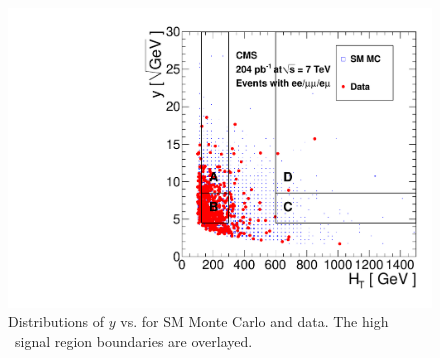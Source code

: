 \begin{figure}[tbh]
\begin{center}
\includegraphics[width=0.7\linewidth]{plots/abcd_204pb_highht.pdf}
\caption{\label{fig:abcdData3}\protect Distributions of $y$ 
vs. \Ht for SM Monte Carlo and data. The high \Ht\ signal region boundaries are overlayed.}
\end{center}
\end{figure}

